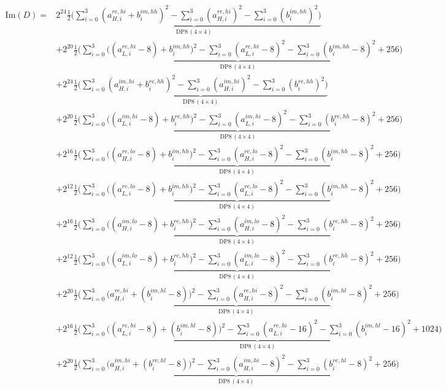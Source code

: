\documentclass[fleqn]{article}
\newcommand{\DPop}[3]{\mathrm{DP#1}\,(#2\!\times\!#3)}
\begin{document}
\begin{align*}
\mathrm{Im}(D) = {}
  & 2^{24}\underbrace{\tfrac12\Big(\sum_{i=0}^{3}(a_{H,i}^{re,hi}{+}b_i^{im,hh})^2 - \sum_{i=0}^{3}(a_{H,i}^{re,hi})^2 - \sum_{i=0}^{3}(b_i^{im,hh})^2\Big)}_{\DPop{8}{4}{4}} \\[0.35em]
  & + 2^{20}\underbrace{\tfrac12\Big(\sum_{i=0}^{3}\big((a_{L,i}^{re,hi}{-}8){+}b_i^{im,hh}\big)^2 - \sum_{i=0}^{3}(a_{L,i}^{re,hi}{-}8)^2 - \sum_{i=0}^{3}(b_i^{im,hh}{-}8)^2 + 256\Big)}_{\DPop{8}{4}{4}} \\[0.35em]
  & + 2^{24}\underbrace{\tfrac12\Big(\sum_{i=0}^{3}(a_{H,i}^{im,hi}{+}b_i^{re,hh})^2 - \sum_{i=0}^{3}(a_{H,i}^{im,hi})^2 - \sum_{i=0}^{3}(b_i^{re,hh})^2\Big)}_{\DPop{8}{4}{4}} \\[0.35em]
  & + 2^{20}\underbrace{\tfrac12\Big(\sum_{i=0}^{3}\big((a_{L,i}^{im,hi}{-}8){+}b_i^{re,hh}\big)^2 - \sum_{i=0}^{3}(a_{L,i}^{im,hi}{-}8)^2 - \sum_{i=0}^{3}(b_i^{re,hh}{-}8)^2 + 256\Big)}_{\DPop{8}{4}{4}} \\[0.35em]
  & + 2^{16}\underbrace{\tfrac12\Big(\sum_{i=0}^{3}\big((a_{H,i}^{re,lo}{-}8){+}b_i^{im,hh}\big)^2 - \sum_{i=0}^{3}(a_{H,i}^{re,lo}{-}8)^2 - \sum_{i=0}^{3}(b_i^{im,hh}{-}8)^2 + 256\Big)}_{\DPop{8}{4}{4}} \\[0.35em]
  & + 2^{12}\underbrace{\tfrac12\Big(\sum_{i=0}^{3}\big((a_{L,i}^{re,lo}{-}8){+}b_i^{im,hh}\big)^2 - \sum_{i=0}^{3}(a_{L,i}^{re,lo}{-}8)^2 - \sum_{i=0}^{3}(b_i^{im,hh}{-}8)^2 + 256\Big)}_{\DPop{8}{4}{4}} \\[0.35em]
  & + 2^{16}\underbrace{\tfrac12\Big(\sum_{i=0}^{3}\big((a_{H,i}^{im,lo}{-}8){+}b_i^{re,hh}\big)^2 - \sum_{i=0}^{3}(a_{H,i}^{im,lo}{-}8)^2 - \sum_{i=0}^{3}(b_i^{re,hh}{-}8)^2 + 256\Big)}_{\DPop{8}{4}{4}} \\[0.35em]
  & + 2^{12}\underbrace{\tfrac12\Big(\sum_{i=0}^{3}\big((a_{L,i}^{im,lo}{-}8){+}b_i^{re,hh}\big)^2 - \sum_{i=0}^{3}(a_{L,i}^{im,lo}{-}8)^2 - \sum_{i=0}^{3}(b_i^{re,hh}{-}8)^2 + 256\Big)}_{\DPop{8}{4}{4}} \\[0.35em]
  & + 2^{20}\underbrace{\tfrac12\Big(\sum_{i=0}^{3}\big(a_{H,i}^{re,hi}{+}(b_i^{im,hl}{-}8)\big)^2 - \sum_{i=0}^{3}(a_{H,i}^{re,hi}{-}8)^2 - \sum_{i=0}^{3}(b_i^{im,hl}{-}8)^2 + 256\Big)}_{\DPop{8}{4}{4}} \\[0.35em]
  & + 2^{16}\underbrace{\tfrac12\Big(\sum_{i=0}^{3}\big((a_{L,i}^{re,hi}{-}8){+}(b_i^{im,hl}{-}8)\big)^2 - \sum_{i=0}^{3}(a_{L,i}^{re,hi}{-}16)^2 - \sum_{i=0}^{3}(b_i^{im,hl}{-}16)^2 + 1024\Big)}_{\DPop{8}{4}{4}} \\[0.35em]
  & + 2^{20}\underbrace{\tfrac12\Big(\sum_{i=0}^{3}\big(a_{H,i}^{im,hi}{+}(b_i^{re,hl}{-}8)\big)^2 - \sum_{i=0}^{3}(a_{H,i}^{im,hi}{-}8)^2 - \sum_{i=0}^{3}(b_i^{re,hl}{-}8)^2 + 256\Big)}_{\DPop{8}{4}{4}} \\[0.35em]

\end{align*}
\end{document}

